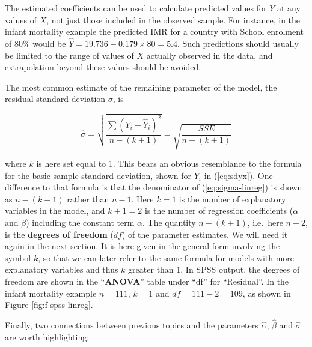 \documentclass[11pt,a4paper,openany]{book}
\begin{document}
The estimated coefficients can be used to calculate predicted values for
\(Y\) at any values of \(X\), not just those included in the observed
sample. For instance, in the infant mortality example the predicted IMR
for a country with School enrolment of 80\% would be
\(\hat{Y}=19.736-0.179\times 80=5.4\). Such predictions should usually
be limited to the range of values of \(X\) actually observed in the
data, and extrapolation beyond these values should be avoided.

The most common estimate of the remaining parameter of the model, the
residual standard deviation \(\sigma\), is

\begin{equation}\hat{\sigma}=
\sqrt{
\frac{\sum (Y_{i}-\hat{Y}_{i})^{2}}{n-(k+1)}
}
=\sqrt{
\frac{SSE}{n-(k+1)}
}
\label{eq:sigma-linreg}\end{equation}

where \(k\) is here set equal to 1. This bears an obvious resemblance to
the formula for the basic sample standard deviation, shown for \(Y_{i}\)
in (\ref{eq:sdyx}). One difference to that formula is that the
denominator of (\ref{eq:sigma-linreg}) is shown as \(n-(k+1)\) rather
than \(n-1\). Here \(k=1\) is the number of explanatory variables in the
model, and \(k+1=2\) is the number of regression coefficients
(\(\alpha\) and \(\beta\)) including the constant term \(\alpha\). The
quantity \(n-(k+1)\), i.e.~here \(n-2\), is the \textbf{degrees of
freedom} (\(df\)) of the parameter estimates. We will need it again in
the next section. It is here given in the general form involving the
symbol \(k\), so that we can later refer to the same formula for models
with more explanatory variables and thus \(k\) greater than 1. In SPSS
output, the degrees of freedom are shown in the ``\textbf{ANOVA}'' table
under ``df'' for ``Residual''. In the infant mortality example
\(n=111\), \(k=1\) and \(df=111-2=109\), as shown in Figure
\ref{fig:f-spss-linreg}.

Finally, two connections between previous topics and the parameters
\(\hat{\alpha}\), \(\hat{\beta}\) and \(\hat{\sigma}\) are worth
highlighting:
\end{document}
